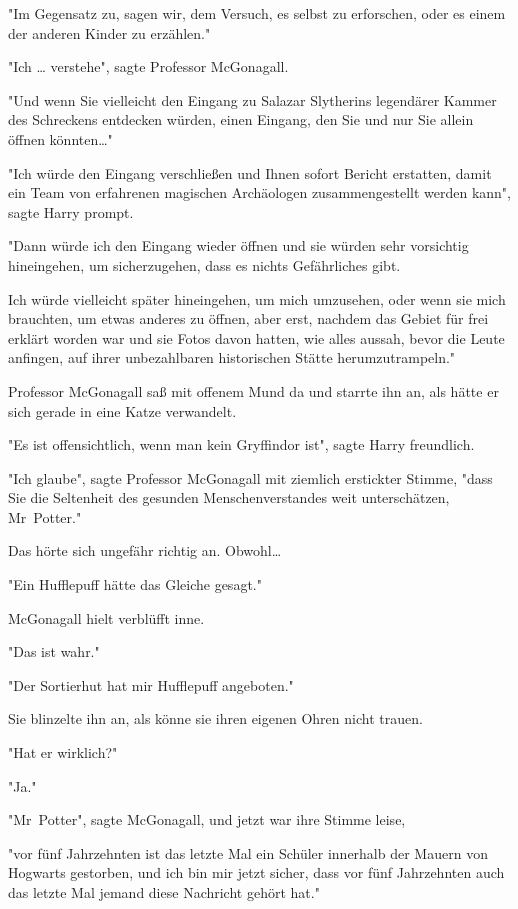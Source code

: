 {"Im Gegensatz zu, sagen wir, dem Versuch, es selbst zu erforschen, oder es einem der anderen Kinder zu erzählen."

"Ich … verstehe", sagte Professor McGonagall.

"Und wenn Sie vielleicht den Eingang zu Salazar Slytherins legendärer Kammer des Schreckens entdecken würden, einen Eingang, den Sie und nur Sie allein öffnen könnten…"

"Ich würde den Eingang verschließen und Ihnen sofort Bericht erstatten, damit ein Team von erfahrenen magischen Archäologen zusammengestellt werden kann", sagte Harry prompt.

"Dann würde ich den Eingang wieder öffnen und sie würden sehr vorsichtig hineingehen, um sicherzugehen, dass es nichts Gefährliches gibt.

Ich würde vielleicht später hineingehen, um mich umzusehen, oder wenn sie mich brauchten, um etwas anderes zu öffnen, aber erst, nachdem das Gebiet für frei erklärt worden war und sie Fotos davon hatten, wie alles aussah, bevor die Leute anfingen, auf ihrer unbezahlbaren historischen Stätte herumzutrampeln."

Professor McGonagall saß mit offenem Mund da und starrte ihn an, als hätte er sich gerade in eine Katze verwandelt.

"Es ist offensichtlich, wenn man kein Gryffindor ist", sagte Harry freundlich.

"Ich glaube", sagte Professor McGonagall mit ziemlich erstickter Stimme, "dass Sie die Seltenheit des gesunden Menschenverstandes weit unterschätzen, Mr~Potter."

Das hörte sich ungefähr richtig an. Obwohl…

"Ein Hufflepuff hätte das Gleiche gesagt."

McGonagall hielt verblüfft inne.

"Das ist wahr."

"Der Sortierhut hat mir Hufflepuff angeboten."

Sie blinzelte ihn an, als könne sie ihren eigenen Ohren nicht trauen.

"Hat er wirklich?"

"Ja."

"Mr~Potter", sagte McGonagall, und jetzt war ihre Stimme leise,

"vor fünf Jahrzehnten ist das letzte Mal ein Schüler innerhalb der Mauern von Hogwarts gestorben, und ich bin mir jetzt sicher, dass vor fünf Jahrzehnten auch das letzte Mal jemand diese Nachricht gehört hat."

}

